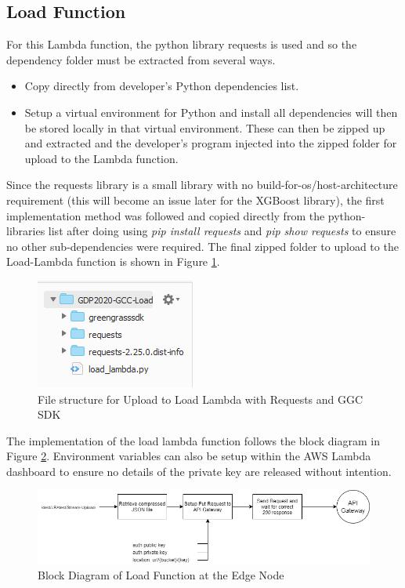 \subsection{Load Function}
\label{load_fn_impl}
For this Lambda function, the python library requests is used and so the dependency folder must be extracted from several ways. 
\begin{itemize}
    \item Copy directly from developer's Python dependencies list.
    \item Setup a virtual environment for Python and install all dependencies will then be stored locally in that virtual environment. These can then be zipped up and extracted and the developer's program injected into the zipped folder for upload to the Lambda function.
\end{itemize}

Since the requests library is a small library with no build-for-os/host-architecture requirement (this will become an issue later for the XGBoost library), the first implementation method was followed and copied directly from the python-libraries list after doing using \textit{pip install requests} and \textit{pip show requests} to ensure no other sub-dependencies were required. The final zipped folder to upload to the Load-Lambda function is shown in Figure \ref{fig:lambda_requests_ggc_sdk}.

\begin{figure}[ht]
    \centering
    \includegraphics{pages/Chapter4/Chapter 4 Images/LambdaFns/ggc_sdk_requests_inclusion.png}
    \caption{File structure for Upload to Load Lambda with Requests and GGC SDK}
    \label{fig:lambda_requests_ggc_sdk}
\end{figure}

The implementation of the load lambda function follows the block diagram in Figure \ref{fig:lambda_load_fn}. Environment variables can also be setup within the AWS Lambda dashboard to ensure no details of the private key are released without intention. 

\begin{figure}[ht]
    \centering
    \includegraphics[width=1\linewidth]{pages/Chapter4/Chapter 4 Images/LambdaFns/load-fn.png}
    \caption{Block Diagram of Load Function at the Edge Node}
    \label{fig:lambda_load_fn}
\end{figure}


